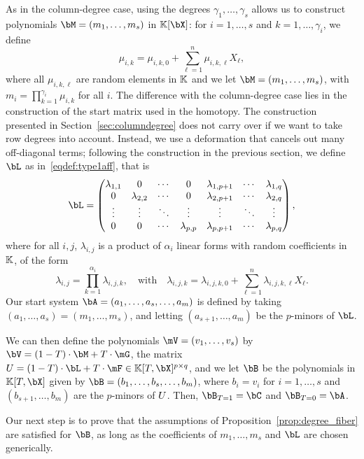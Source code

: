 \documentclass[12pt]{article}
\begin{document}
As in the column-degree case, using the degrees
$\gamma_1,\dots,\gamma_s$ allows us to construct polynomials
$\bM=(m_1,\dots,m_s)$ in $\KK[\bX]$: for $i=1,\dots,s$ and $k=1,\dots,\gamma_i$,
we define
\begin{equation}\label{eqdef:ai}
\mu_{i,k} = \mu_{i,k,0} + \sum_{\ell = 1}^{n}\mu_{i,k,\ell}X_\ell,
\end{equation}
where all $\mu_{i,k,\ell}$ are random elements in $\mathbb{K}$ and we let
$\bM=(m_1,\dots,m_s)$, with $m_i=\prod_{k=1}^{\gamma_i} \mu_{i,k}$ for
all $i$. The difference with the column-degree case lies in the
construction of the start matrix used in the homotopy. The
construction presented in Section~\ref{sec:columndegree} does not
carry over if we want to take row degrees into account. Instead, we
use a deformation that cancels out many off-diagonal terms; following
the construction in the previous section, we define $\bL$ as
in~\eqref{eqdef:type1aff}, that is
\begin{align*}
\bL = \left( \begin{matrix}
\lambda_{1,1} & 0 & \cdots & 0 & \lambda_{1,p+1} & \cdots & \lambda_{1, q}\\
0 & \lambda_{2,2} & \cdots & 0 & \lambda_{2,p+1} & \cdots & \lambda_{2, q}\\
\vdots & \vdots & \ddots & \vdots & \vdots & \ddots & \vdots\\
0 & 0 & \cdots & \lambda_{p,p} & \lambda_{p,p+1} & \cdots & \lambda_{p, q}
\end{matrix} \right), 
\end{align*} 
where for all $i,j$, $\lambda_{i,j}$ is a product of $\alpha_i$ linear
forms with random coefficients in $\mathbb{K}$, of the form
$$\lambda_{i,j}= \prod_{k=1}^{\alpha_i}\lambda_{i,j,k},
\quad\text{with}\quad
\lambda_{i,j,k} =\lambda_{i,j,k,0} + \sum_{\ell=1}^n \lambda_{i,j,k,\ell}X_\ell.
$$ Our start system $\bA=(a_1,\dots,a_s,\dots,a_m)$ is defined by
taking $(a_1,\dots,a_s) = (m_1,\dots,m_s)$, and letting
$(a_{s+1},\dots,a_m)$ be the $p$-minors of $\bL$.

We can then define the polynomials $\mV=(v_1,\dots,v_s)$ by $\bV =
(1-T) \cdot \bM + T \cdot \mG$, the matrix $\mU=(1-T)\cdot \bL + T
\cdot \mF \in \KK[T,\bX]^{p\times q}$, and we let $\bB$ be the
polynomials in $\KK[T,\bX]$ given by $\bB=(b_1,\dots,b_s,\dots,b_m)$,
where $b_i=v_i$ for $i=1,\dots,s$ and $(b_{s+1},\dots,b_{m})$ are the
$p$-minors of ${U}$.  Then, $\bB_{T=1}=\bC$ and $\bB_{T=0}=\bA$.

Our next step is to prove that the assumptions of
Proposition~\ref{prop:degree_fiber} are satisfied for $\bB$, as long
as the coefficients of $m_1,\dots,m_s$ and $\bL$ are chosen
generically.
\end{document}
